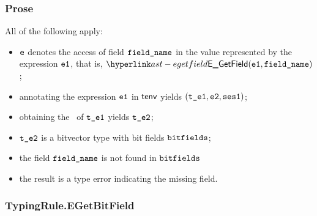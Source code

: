 \subsubsection{Prose}
All of the following apply:
\begin{itemize}
  \item $\ve$ denotes the access of field $\fieldname$ in the value represented by the expression $\veone$, that is, $\EGetField(\veone, \fieldname)$;
  \item annotating the expression $\veone$ in $\tenv$ yields $(\vteone, \vetwo, \vsesone)$\ProseOrTypeError;
  \item obtaining the \underlyingtype\ of $\vteone$ yields $\vtetwo$\ProseOrTypeError;
  \item $\vtetwo$ is a bitvector type with bit fields $\bitfields$;
  \item the field $\fieldname$ is not found in $\bitfields$
  \item the result is a type error indicating the missing field.
\end{itemize}
\begin{mathpar}
\end{mathpar}

\subsubsection{TypingRule.EGetBitField\label{sec:TypingRule.EGetBitField}}
